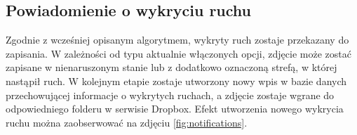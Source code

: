 \subsection{Powiadomienie o wykryciu ruchu}
Zgodnie z wcześniej opisanym algorytmem, wykryty ruch zostaje przekazany do zapisania. W zależności od typu aktualnie włączonych opcji, zdjęcie może zostać zapisane w nienaruszonym stanie lub z dodatkowo oznaczoną strefą, w której nastąpił ruch. W kolejnym etapie zostaje utworzony nowy wpis w bazie danych przechowującej informacje o wykrytych ruchach, a zdjęcie zostaje wgrane do odpowiedniego folderu w serwisie Dropbox. Efekt utworzenia nowego wykrycia ruchu można zaobserwować na zdjęciu \ref{fig:notifications}.
